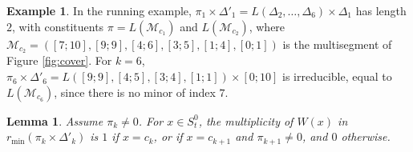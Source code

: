\documentclass[a4paper,12pt,leqno]{amsart}
\newcommand{\caM}{\mathcal{M}}
\theoremstyle{plain}
\newtheorem{lemma}[thm]{Lemma}
\theoremstyle{definition}
\theoremstyle{definition}
\newtheorem{example}[thm]{Example}
\begin{document}
\begin{example}\label{ex:run4} In the running example, $\pi_1\times\Delta'_1=L(\Delta_2,\ldots,
\Delta_6)\times\Delta_1$ has length $2$, with constituents $\pi=L(\caM_{c_1})$ and $L(\caM_{c_2})$,
where $\caM_{c_2}=([7;10],[9;9],[4;6],[3;5],[1;4],[0;1])$ is the multisegment of Figure
\ref{fig:cover}. For $k=6$, $\pi_6\times\Delta'_6=L([9;9],[4;5],[3;4],[1;1])\times[0;10]$ is
irreducible, equal to $L(\caM_{c_6})$, since there is no minor of index $7$.
\end{example}


\begin{lemma}\label{lem:words} Assume $\pi_k\neq0$. For $x\in S_t^0$, the multiplicity of $W(x)$ in
$r_{\min}(\pi_k\times\Delta'_k)$ is $1$ if $x=c_k$, or if $x=c_{k+1}$ and $\pi_{k+1}\neq 0$, and
$0$ otherwise.
\end{lemma}
\end{document}
